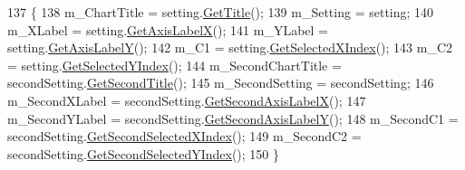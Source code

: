 \begin{DoxyCode}
137                                                                          \{       
138         m\_ChartTitle = setting.\hyperlink{class_data_attribute_ade9747a192ba22fe1020e874bff6a48c}{GetTitle}();
139         m\_Setting = setting;
140         m\_XLabel = setting.\hyperlink{class_data_attribute_aecb451704a87d77dd80dbad8a19099d1}{GetAxisLabelX}();
141         m\_YLabel = setting.\hyperlink{class_data_attribute_af5f68794cd0195d42135d5e48120ccc0}{GetAxisLabelY}();
142         m\_C1 = setting.\hyperlink{class_data_attribute_a0f4a54973bc44b0526f78bda945dc81b}{GetSelectedXIndex}();
143         m\_C2 = setting.\hyperlink{class_data_attribute_a82e7519853d9f470ea183dd0c39a03d6}{GetSelectedYIndex}();
144         m\_SecondChartTitle = secondSetting.\hyperlink{class_data_attribute_a4079522c93025fce7569eaed585f4aeb}{GetSecondTitle}();
145         m\_SecondSetting = secondSetting;
146         m\_SecondXLabel = secondSetting.\hyperlink{class_data_attribute_a8ace4cb1fee9e2abeabe3efc9a190c8f}{GetSecondAxisLabelX}();
147         m\_SecondYLabel = secondSetting.\hyperlink{class_data_attribute_a6efb7e067317898feefbbf6bd472b998}{GetSecondAxisLabelY}();
148         m\_SecondC1 = secondSetting.\hyperlink{class_data_attribute_a7f501790eee650ddf9ac17c4f63a3995}{GetSecondSelectedXIndex}();
149         m\_SecondC2 = secondSetting.\hyperlink{class_data_attribute_a6f61ad05915f4aa31ad3dba00596da64}{GetSecondSelectedYIndex}();
150     \}
\end{DoxyCode}


